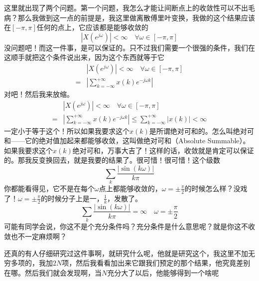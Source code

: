 \documentclass[a4paper,12pt]{article}
\begin{document}
这里就出现了两个问题。第一个问题，我怎么才能让间断点上的收敛性可以不出毛病？那么我做到这一点的前提是，我这里做离散傅里叶变换，我做的这个结果应该在$\left [-\pi ,\pi \right ]$任何的点上，它应该都是能够收敛的
\begin{equation}
   \left |  X\left ( e^{j\omega } \right) \right |  < \infty \quad \forall\omega \in \left [-\pi ,\pi \right ]
\end{equation}
没问题吧！而这一件事，是可以保证的。只不过我们需要一个很强的条件，我们在这顺手就把这个条件说出来，因为这个东西就等于它
\begin{equation}
\begin{aligned}
   &\left |  X\left ( e^{j\omega } \right) \right |  < \infty \quad \forall\omega \in \left [-\pi ,\pi \right ]\\
=&\left |\sum_{k=-\infty}^{+\infty}x(k)e^{-j\omega k}\right |
\end{aligned}
\end{equation}
对吧！然后我来放缩。
\begin{equation}
\begin{aligned}
   &\left |  X\left ( e^{j\omega } \right) \right |  < \infty \quad \forall\omega \in \left [-\pi ,\pi \right ]\\
=&\left |\sum_{k=-\infty}^{+\infty}x(k)e^{-j\omega k}\right |\le \sum_{k=-\infty}^{+\infty}\left | x(k) \right | < \infty
\end{aligned}
\end{equation}
一定小于等于这个！所以如果我要求这个$x(k)$是所谓绝对可和的。怎么叫绝对可和——它的绝对值加起来都能够收敛，这叫做绝对可和（Absolute Summable）。如果我要求这个$x(k)$绝对可和，万事大吉了！这样的话，收敛就是肯定可以保证的。那我反变换回去，就是我要的结果了。很可惜！很可惜！这个级数
\begin{equation}
    \sum_{k}\frac{\left | \sin \left( k\omega \right)\right | }{k\pi}
\end{equation}
你都能看得见，它不是在每个$\omega$点上都能够收敛的，$\omega = \pm \frac{\pi}{2}$的时候怎么样？没戏了！$\omega = \pm \frac{\pi}{2}$的时候分子上是一，$\frac{1}{k}$，发散了。
\begin{equation}
    \sum_{k}\frac{\left | \sin \left( k\omega \right)\right | }{k\pi} = \infty \quad \omega = \pm \frac{\pi}{2}
\end{equation}
可能有同学会说，你这不是个充分条件吗？充分条件是什么意思呢？就是你这不收敛也不一定麻烦啊？

还真的有人仔细研究过这件事啊，就研究什么呢，他就是研究这个，我这里不加无穷多项的，我加$2N$项，然后我看看加出来它跟我们预定的那个结果，他究竟差别在哪。然后我们就会发现啊，当$N$充分大了以后，他能够得到一个啥呢
\end{document}
